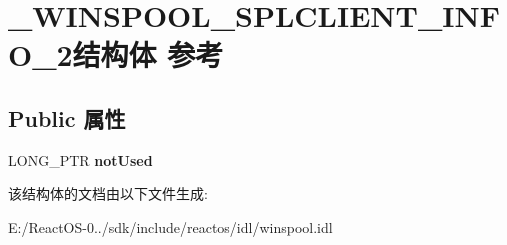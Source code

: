 \hypertarget{struct___w_i_n_s_p_o_o_l___s_p_l_c_l_i_e_n_t___i_n_f_o__2}{}\section{\+\_\+\+W\+I\+N\+S\+P\+O\+O\+L\+\_\+\+S\+P\+L\+C\+L\+I\+E\+N\+T\+\_\+\+I\+N\+F\+O\+\_\+2结构体 参考}
\label{struct___w_i_n_s_p_o_o_l___s_p_l_c_l_i_e_n_t___i_n_f_o__2}
\subsection*{Public 属性}
\begin{DoxyCompactItemize}
\item 
\mbox{\label{struct___w_i_n_s_p_o_o_l___s_p_l_c_l_i_e_n_t___i_n_f_o__2_a33b3745072c6c76aa50dcb76c2e34b8a}} 
L\+O\+N\+G\+\_\+\+P\+TR {\bfseries not\+Used}
\end{DoxyCompactItemize}


该结构体的文档由以下文件生成\+:\begin{DoxyCompactItemize}
\item 
E\+:/\+React\+O\+S-\/0../sdk/include/reactos/idl/winspool.\+idl\end{DoxyCompactItemize}
